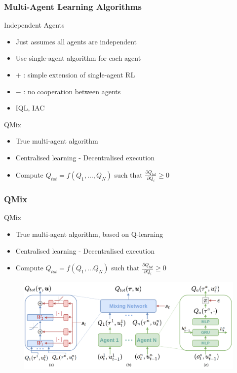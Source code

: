 \documentclass{beamer}
\begin{document}
\begin{frame}
\frametitle{Multi-Agent Learning Algorithms}
\begin{block}{Independent Agents}
\begin{itemize}
    \item Just assumes all agents are independent
    \item Use single-agent algorithm for each agent
    \item $+$ : simple extension of single-agent RL
    \item $-$ : no cooperation between agents
    \item IQL, IAC
\end{itemize}
\end{block}
\begin{block}{QMix}
\begin{itemize}
    \item True multi-agent algorithm
    \item Centralised learning - Decentralised execution
    \item Compute $Q_{tot} = f(Q_1, \dots, Q_N)$ such that $\frac{\partial Q_{tot}}{\partial Q_i} \geq 0$
\end{itemize}
\end{block}
\end{frame}

\begin{frame}
\frametitle{QMix}
\begin{block}{QMix}
\begin{itemize}
    \item True multi-agent algorithm, based on Q-learning
    \item Centralised learning - Decentralised execution
    \item Compute $Q_{tot} = f(Q_1, \dots Q_N)$ such that $\frac{\partial Q_{tot}}{\partial Q_i} \geq 0$
\end{itemize}
\end{block}
\begin{figure}[htp]
    \centering
    \includegraphics[scale=0.2]{images/qmix_structure.png}
\end{figure}
\end{frame}
\end{document}

